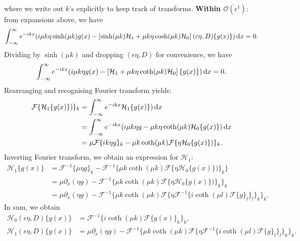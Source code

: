\documentclass[10pt,reqno,oneside,a4paper]{article}
\begin{document}
where we write out $k$'s explicitly to keep track of transforms.
\newline \textbf{Within $\mathcal{O}(\epsilon^1):$} from expansions above, we have 
\begin{align*}
\int_{-\infty}^{\infty} e^{-ikx}( i \mu k \eta \sinh(\mu k) g(x) - \left[ \sinh(\mu k)\mathcal{H}_1 + \mu k \eta \cosh(\mu k) \mathcal{H}_0 \right]( \varepsilon \eta, D)\{ g(x) \}) \,\mathrm{d} x = 0.
\end{align*}
Dividing by $\sinh(\mu k)$ and dropping $( \epsilon \eta, D)$ for convenience, we have 
\begin{align*}
\int_{-\infty}^{\infty} e^{-ikx}( i \mu k \eta g(x) - \left[\mathcal{H}_1 + \mu k \eta \coth(\mu k) \mathcal{H}_0 \right]\{ g(x) \}) \,\mathrm{d} x = 0.
\end{align*}
Rearranging and recognising Fourier transform yields:
\begin{align*}
\mathcal{F} \{\mathcal{H}_1 \{ g(x) \})\}_k &= \int_{-\infty}^{\infty} e^{-ikx}  \mathcal{H}_1 \{ g(x) \}) \,\mathrm{d} x \\
&= \int_{-\infty}^{\infty} e^{-ikx}( i \mu k \eta g  - \mu k \eta \coth(\mu k) \mathcal{H}_0 \{ g(x) \}) \,\mathrm{d} x \\
&= \mu \mathcal{F} \{ i k \eta g \}_k - \mu k \coth(\mu k) \mathcal{F} \{ \eta \mathcal{H}_0 \{ g(x) \}) \}_k.
\end{align*}
Inverting Fourier transform, we obtain an expression for $\mathcal{H}_1:$
\begin{align*}
\mathcal{H}_1 \{ g(x) \} &= \mathcal{F}^{-1} \{ \mu \eta g \}_k - \mathcal{F}^{-1} \{ \mu k \coth(\mu k) \mathcal{F} \{ \eta \mathcal{H}_0 \{ g(x) \}) \}_k \} \\
&= \mu \partial_x(\eta g) - \mathcal{F}^{-1} \{ \mu k \coth(\mu k) \mathcal{F} \{ \eta \mathcal{H}_0 \{ g(x) \}) \}_k \}_k \\
&= \mu \partial_x(\eta g) - \mathcal{F}^{-1} \{ \mu k \coth(\mu k) \mathcal{F} \{ \eta \mathcal{F}^{-1}\{i \coth(\mu l) \mathcal{F}\{g\}_l \}_l \}_k \}_k.
\end{align*}
In sum, we obtain 
\begin{align*}
\mathcal{H}_0( \epsilon \eta, D)\{ g(x) \} &= \mathcal{F}^{-1}\{i \coth(\mu k) \mathcal{F}\{g(x)\}_k \}_k, \\
\mathcal{H}_1( \epsilon \eta, D) \{ g(x) \} &= \mu \partial_x(\eta g) - \mathcal{F}^{-1} \{ \mu k \coth(\mu k) \mathcal{F} \{ \eta \mathcal{F}^{-1}\{i \coth(\mu l) \mathcal{F}\{g\}_l \}_l \}_k \}_k.
\end{align*}
\end{document}

